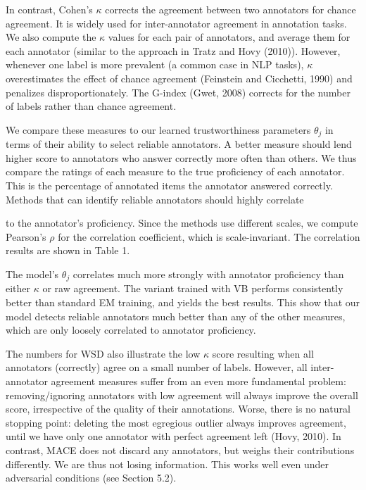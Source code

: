 \documentclass[
]{article}
\begin{document}
In contrast, Cohen's \(\kappa\) corrects the agreement between two
annotators for chance agreement. It is widely used for inter-annotator
agreement in annotation tasks. We also compute the \(\kappa\) values for
each pair of annotators, and average them for each annotator (similar to
the approach in Tratz and Hovy (2010)). However, whenever one label is
more prevalent (a common case in NLP tasks), \(\kappa\) overestimates
the effect of chance agreement (Feinstein and Cicchetti, 1990) and
penalizes disproportionately. The G-index (Gwet, 2008) corrects for the
number of labels rather than chance agreement.

We compare these measures to our learned trustworthiness parameters
\(\theta_{j}\) in terms of their ability to select reliable annotators.
A better measure should lend higher score to annotators who answer
correctly more often than others. We thus compare the ratings of each
measure to the true proficiency of each annotator. This is the
percentage of annotated items the annotator answered correctly. Methods
that can identify reliable annotators should highly correlate

to the annotator's proficiency. Since the methods use different scales,
we compute Pearson's \(\rho\) for the correlation coefficient, which is
scale-invariant. The correlation results are shown in Table 1.

The model's \(\theta_{j}\) correlates much more strongly with annotator
proficiency than either \(\kappa\) or raw agreement. The variant trained
with VB performs consistently better than standard EM training, and
yields the best results. This show that our model detects reliable
annotators much better than any of the other measures, which are only
loosely correlated to annotator proficiency.

The numbers for WSD also illustrate the low \(\kappa\) score resulting
when all annotators (correctly) agree on a small number of labels.
However, all inter-annotator agreement measures suffer from an even more
fundamental problem: removing/ignoring annotators with low agreement
will always improve the overall score, irrespective of the quality of
their annotations. Worse, there is no natural stopping point: deleting
the most egregious outlier always improves agreement, until we have only
one annotator with perfect agreement left (Hovy, 2010). In contrast,
MACE does not discard any annotators, but weighs their contributions
differently. We are thus not losing information. This works well even
under adversarial conditions (see Section 5.2).
\end{document}
